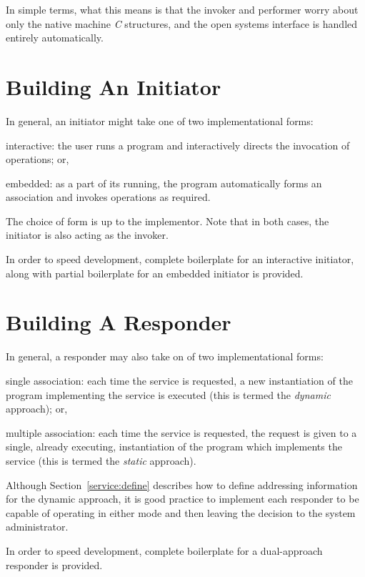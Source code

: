In simple terms,
what this means is that the invoker and performer worry about only the
native machine {\em C\/} structures,
and the open systems interface is handled entirely automatically.

\section	{Building An Initiator}
In general,
an initiator might take one of two implementational forms:
\begin{describe}
\item[interactive:] the user runs a program and interactively directs the
invocation of operations;
or,

\item[embedded:] as a part of its running,
the program automatically forms an association and invokes operations as
required.
\end{describe}
The choice of form is up to the implementor.
Note that in both cases, the initiator is also acting as the invoker.

In order to speed development,
complete boilerplate for an interactive initiator,
along with partial boilerplate for an embedded initiator is provided.

\section	{Building A Responder}
In general,
a responder may also take on of two implementational forms:
\begin{describe}
\item[single association:] each time the service is requested,
a new instantiation of the program implementing the service is executed
(this is termed the {\em dynamic\/} approach);
or,

\item[multiple association:] each time the service is requested,
the request is given to a single, already executing,
instantiation of the program which implements the service
(this is termed the {\em static\/} approach).
\end{describe}
Although Section~\ref{service:define} describes how to define addressing
information for the dynamic approach,
it is good practice to implement each responder to be capable of operating in
either mode and then leaving the decision to the system administrator.

In order to speed development,
complete boilerplate for a dual-approach responder is provided.

